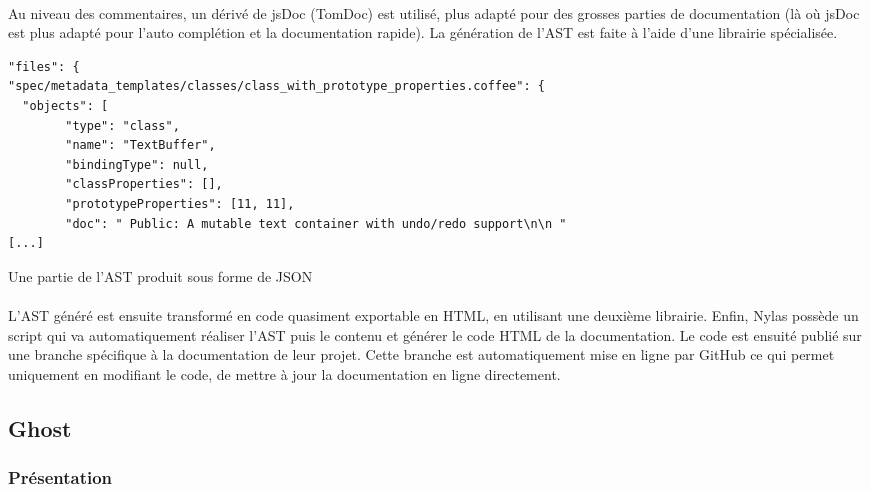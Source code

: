         \paragraph{}
            Au niveau des commentaires, un dérivé de jsDoc (TomDoc\cite{tomdoc}) est utilisé, plus adapté
            pour des grosses parties de documentation (là où jsDoc est plus adapté pour l'auto complétion et la documentation rapide).
            La génération de l'AST est faite à l'aide d'une librairie spécialisée\cite{donna}.
        \begin{listing}[ht]
            \begin{verbatim}
"files": {
"spec/metadata_templates/classes/class_with_prototype_properties.coffee": {
  "objects": [
        "type": "class",
        "name": "TextBuffer",
        "bindingType": null,
        "classProperties": [],
        "prototypeProperties": [11, 11],
        "doc": " Public: A mutable text container with undo/redo support\n\n "
[...]
            \end{verbatim}
            \caption{Une partie de l'AST produit sous forme de JSON}
        \end{listing}

        \paragraph{}
            L'AST généré est ensuite transformé en code quasiment exportable en HTML, en utilisant une deuxième librairie\cite{tello}.
            Enfin, Nylas possède un script qui va automatiquement réaliser l'AST puis le contenu et générer le code HTML de la documentation.
            Le code est ensuité publié sur une branche spécifique à la documentation de leur projet.
            Cette branche est automatiquement mise en ligne par GitHub\cite{ghpages} ce qui permet uniquement en
            modifiant le code, de mettre à jour la documentation en ligne directement.

\subsection{Ghost}
    \subsubsection{Présentation}

